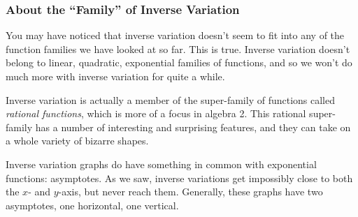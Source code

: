 \subsubsection{About the ``Family'' of Inverse Variation}

You may have noticed that inverse variation doesn't seem to fit into any of the function families we have looked at so far. This is true. Inverse variation doesn't belong to linear, quadratic, exponential families of functions, and so we won't do much more with inverse variation for quite a while.

Inverse variation is actually a member of the super-family of functions called \textit{rational functions}, which is more of a focus in algebra 2. This rational super-family has a number of interesting and surprising features, and they can take on a whole variety of bizarre shapes.

Inverse variation graphs do have something in common with exponential functions: asymptotes. As we saw, inverse variations get impossibly close to both the $x$- and $y$-axis, but never reach them. Generally, these graphs have two asymptotes, one horizontal, one vertical.
